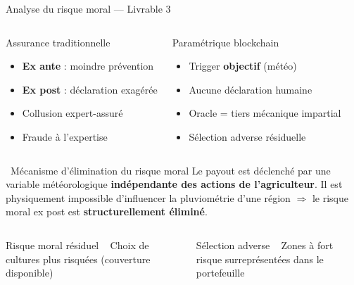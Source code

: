 \documentclass[aspectratio=169, 10pt, t]{beamer}
\newcommand{\warn}[1]{\textcolor{WarnOrange}{\faExclamationTriangle\ #1}}
\begin{document}
\begin{frame}{Analyse du risque moral --- Livrable 3}
  \begin{columns}[t]
      \begin{alertblock}{Assurance traditionnelle}
        \begin{itemize}
          \setlength{\itemsep}{4pt}
          \item[\textcolor{AlertRed}{\faTimesCircle}] \textbf{Ex ante} : moindre prévention
          \item[\textcolor{AlertRed}{\faTimesCircle}] \textbf{Ex post} : déclaration exagérée
          \item[\textcolor{AlertRed}{\faTimesCircle}] Collusion expert-assuré
          \item[\textcolor{AlertRed}{\faTimesCircle}] Fraude à l'expertise
        \end{itemize}
      \end{alertblock}
      \begin{exampleblock}{Paramétrique blockchain}
        \begin{itemize}
          \setlength{\itemsep}{4pt}
          \item[\textcolor{SuccessGreen}{\faCheckCircle}] Trigger \textbf{objectif} (météo)
          \item[\textcolor{SuccessGreen}{\faCheckCircle}] Aucune déclaration humaine
          \item[\textcolor{SuccessGreen}{\faCheckCircle}] Oracle = tiers mécanique impartial
          \item[\textcolor{WarnOrange}{\faExclamationTriangle}] Sélection adverse résiduelle
        \end{itemize}
      \end{exampleblock}
  \end{columns}

  \vspace{0.3em}
  \begin{block}{\faKey\ Mécanisme d'élimination du risque moral}
    \small
    Le payout est déclenché par une variable météorologique
    \textbf{indépendante des actions de l'agriculteur}.
    Il est physiquement impossible d'influencer la pluviométrie d'une région
    $\Rightarrow$ le risque moral ex post est \textbf{structurellement éliminé}.
  \end{block}

  \vspace{0.2em}
  \begin{columns}[t]
      \begin{alertblock}{\small Risque moral résiduel}
        \small\warn{} Choix de cultures plus risquées (couverture disponible)
      \end{alertblock}
      \begin{alertblock}{\small Sélection adverse}
        \small\warn{} Zones à fort risque surreprésentées dans le portefeuille
      \end{alertblock}
  \end{columns}
\end{frame}
\end{document}
